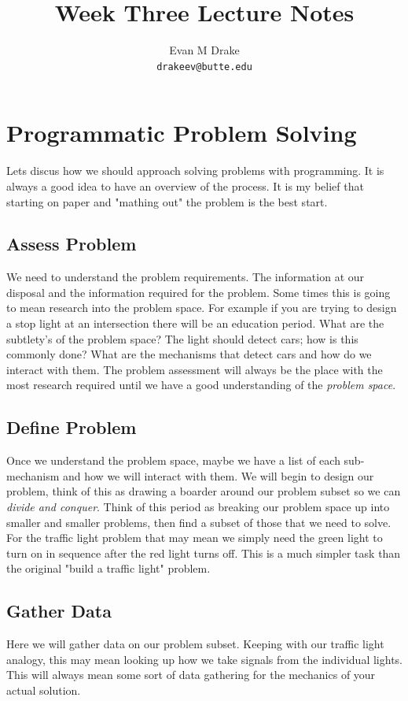 \documentclass[12pt]{article}
\title{Week Three Lecture Notes}
\author{
	Evan M Drake \\
	\texttt{drakeev@butte.edu}
}
\begin{document}
	\maketitle
	\tableofcontents

	\newpage


	\section{Programmatic Problem Solving}
		Lets discus how we should approach solving problems with programming.
		It is always a good idea to have an overview of the process.
		It is my belief that starting on paper and "mathing out" the problem is the best start.
		\subsection{Assess Problem}
			We need to understand the problem requirements.
			The information at our disposal and the information required for the problem.
			Some times this is going to mean research into the problem space.
			For example if you are trying to design a stop light at an intersection there will be an education period.
			What are the subtlety's of the problem space?
			The light should detect cars;
				how is this commonly done? What are the mechanisms that detect cars and how do we interact with them.
			The problem assessment will always be the place with the most research required until we have a good understanding of the \textit{problem space}.

		\subsection{Define Problem}
			Once we understand the problem space,
				maybe we have a list of each sub-mechanism and how we will interact with them.
			We will begin to design our problem,
				think of this as drawing a boarder around our problem subset so we can \textit{divide and conquer}.
			Think of this period as breaking our problem space up into smaller and smaller problems,
				then find a subset of those that we need to solve.
			For the traffic light problem that may mean we simply need the green light to turn on in sequence after the red light turns off.
			This is a much simpler task than the original "build a traffic light" problem.

		\subsection{Gather Data}
			Here we will gather data on our problem subset.
			Keeping with our traffic light analogy,
				this may mean looking up how we take signals from the individual lights.
			This will always mean some sort of data gathering for the mechanics of your actual solution.
\end{document}
